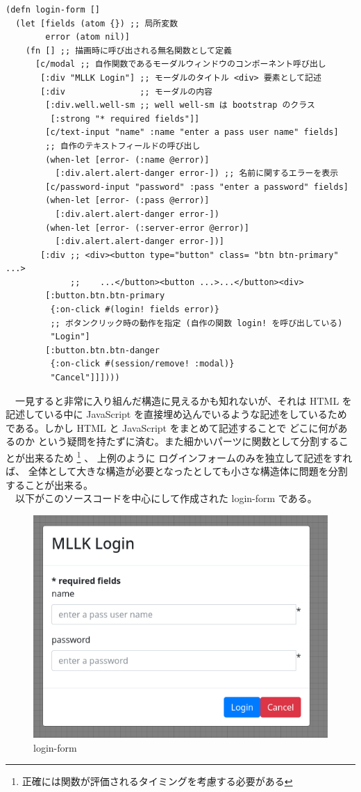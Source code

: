 \documentclass{scrartcl}
\begin{document}
\begin{verbatim}
(defn login-form []
  (let [fields (atom {}) ;; 局所変数
        error (atom nil)] 
    (fn [] ;; 描画時に呼び出される無名関数として定義
      [c/modal ;; 自作関数であるモーダルウィンドウのコンポーネント呼び出し
       [:div "MLLK Login"] ;; モーダルのタイトル <div> 要素として記述
       [:div               ;; モーダルの内容
        [:div.well.well-sm ;; well well-sm は bootstrap のクラス
         [:strong "* required fields"]]
        [c/text-input "name" :name "enter a pass user name" fields] 
        ;; 自作のテキストフィールドの呼び出し
        (when-let [error- (:name @error)]
          [:div.alert.alert-danger error-]) ;; 名前に関するエラーを表示
        [c/password-input "password" :pass "enter a password" fields]
        (when-let [error- (:pass @error)]
          [:div.alert.alert-danger error-])
        (when-let [error- (:server-error @error)]
          [:div.alert.alert-danger error-])]
       [:div ;; <div><button type="button" class= "btn btn-primary" ...>
             ;;    ...</button><button ...>...</button><div>
        [:button.btn.btn-primary
         {:on-click #(login! fields error)} 
         ;; ボタンクリック時の動作を指定 (自作の関数 login! を呼び出している)
         "Login"]
        [:button.btn.btn-danger
         {:on-click #(session/remove! :modal)} 
         "Cancel"]]])))
\end{verbatim}

　一見すると非常に入り組んだ構造に見えるかも知れないが、それは HTML を記述している中に JavaScript を直接埋め込んでいるような記述をしているためである。しかし HTML と JavaScript をまとめて記述することで どこに何があるのか という疑問を持たずに済む。また細かいパーツに関数として分割することが出来るため \footnote{正確には関数が評価されるタイミングを考慮する必要がある} 、 上例のように ログインフォームのみを独立して記述をすれば、 全体として大きな構造が必要となったとしても小さな構造体に問題を分割することが出来る。\\
　以下がこのソースコードを中心にして作成された login-form である。\\
\begin{figure}[htbp]
\centering
\includegraphics[width=15cm]{./login-view.PNG}
\caption{login-form}
\end{figure}
\end{document}
